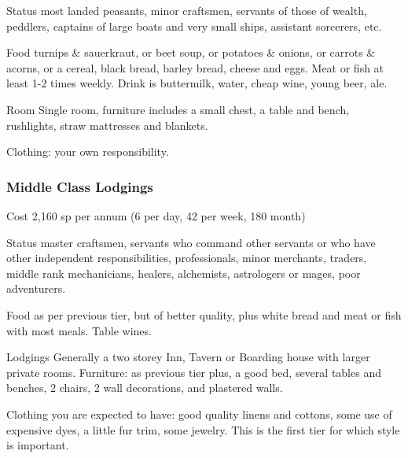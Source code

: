 \documentclass[twoside,a4paper]{article}
\begin{document}
\begin{multicols}{2}
\begin{idesc}
\item[Status] most landed peasants, minor craftsmen, servants of those
of wealth, peddlers, captains of large boats and very small ships,
assistant sorcerers, etc.

\item[Food] turnips \& sauerkraut, or beet soup, or potatoes \&
onions, or carrots \& acorns, or a cereal, black bread, barley bread,
cheese and eggs. Meat or fish at least 1-2 times weekly. Drink is
buttermilk, water, cheap wine, young beer, ale.

\item[Room] Single room, furniture includes a small chest, a table and
bench, rushlights, straw mattresses and blankets.

Clothing: your own responsibility.

\end{idesc}

\subsubsection{Middle Class Lodgings}


\begin{idesc}

\item[Cost] 2,160 sp per annum (6 per day, 42 per week, 180 month)

\item[Status] master craftsmen, servants who command other servants
or who have other independent responsibilities, professionals, minor
merchants, traders, middle rank mechanicians, healers, alchemists,
astrologers or mages, poor adventurers.

\item[Food] as per previous tier, but of better quality, plus white
bread and meat or fish with most meals. Table wines.

\item[Lodgings] Generally a two storey Inn, Tavern or Boarding house
with larger private rooms. Furniture: as previous tier plus, a good
bed, several tables and benches, 2 chairs, 2 wall decorations, and
plastered walls.

\item[Clothing] you are expected to have: good quality linens and
cottons, some use of expensive dyes, a little fur trim, some
jewelry. This is the first tier for which style is important.

\end{idesc}



\end{multicols}
\end{document}
